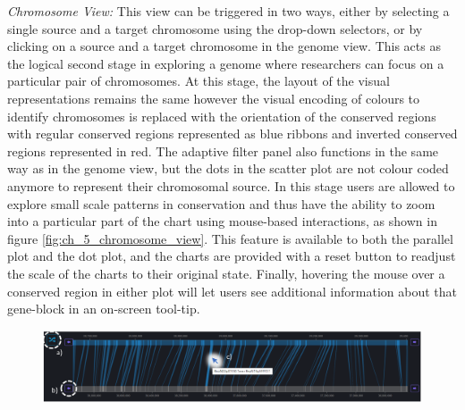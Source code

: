 \textit{Chromosome View:} This view can be triggered in two ways, either by selecting a single source and a target chromosome using the drop-down selectors, or by clicking on a source and a target chromosome in the genome view. This acts as the logical second stage in exploring a genome where researchers can focus on a particular pair of chromosomes. At this stage, the layout of the visual representations remains the same however the visual encoding of colours to identify chromosomes is replaced with the orientation of the conserved regions with regular conserved regions represented as blue ribbons and inverted conserved regions represented in red. The adaptive filter panel also functions in the same way as in the genome view, but the dots in the scatter plot are not colour coded anymore to represent their chromosomal source. In this stage users are allowed to explore small scale patterns in conservation and thus have the ability to zoom into a particular part of the chart using mouse-based interactions, as shown in figure \ref{fig:ch_5_chromosome_view}. This feature is available to both the parallel plot and the dot plot, and the charts are provided with a reset button to readjust the scale of the charts to their original state. Finally, hovering the mouse over a conserved region in either plot will let users see additional information about that gene-block in an on-screen tool-tip.



\begin{figure}[h]
  \centering
  \includegraphics[width=1\linewidth]{images/ch_5_block_view.PNG}
  \label{fig:ch_5_block_view}
\end{figure} 

